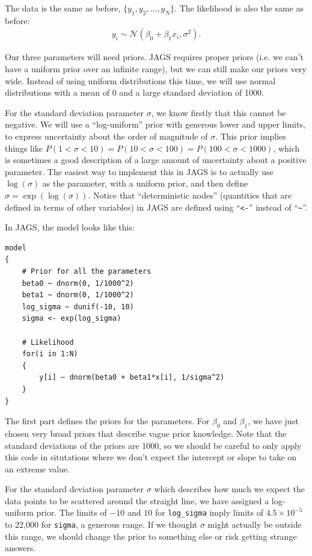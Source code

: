 The data is the same as before, $\{y_1, y_2, ..., y_N\}$. The likelihood is
also the same as before:
\begin{eqnarray}
y_i \sim \mathcal{N}(\beta_0 + \beta_1 x_i, \sigma^2).
\end{eqnarray}

Our three parameters will need priors. JAGS requires proper priors (i.e. we
can't have a uniform prior over an infinite range), but we can still make our
priors very wide. Instead of using uniform distributions this time,
we will use normal distributions with a mean of 0 and a large standard deviation
of 1000.

For the standard deviation parameter $\sigma$, we know firstly that this cannot
be negative. We will use a ``log-uniform'' prior with generous lower and upper limits,
to express uncertainty about the order of magnitude of $\sigma$. This prior implies
things like $P(1 < \sigma < 10) = P(10 < \sigma < 100) = P(100 < \sigma < 1000)$,
which is sometimes a good description of a large amount of uncertainty about
a positive parameter. The easiest way to implement this in JAGS is to actually
use $\log(\sigma)$ as the parameter, with a uniform prior, and then define
$\sigma = \exp\left(\log(\sigma)\right)$. Notice that ``deterministic nodes''
(quantities that are defined in terms of other variables) in JAGS are defined
using ``{\tt <-}'' instead of ``{\tt \~{ }}''.

In JAGS, the model looks like this:
\begin{framed}
\begin{verbatim}
model
{
    # Prior for all the parameters
    beta0 ~ dnorm(0, 1/1000^2)
    beta1 ~ dnorm(0, 1/1000^2)
    log_sigma ~ dunif(-10, 10)
    sigma <- exp(log_sigma)

    # Likelihood
    for(i in 1:N)
    {
        y[i] ~ dnorm(beta0 + beta1*x[i], 1/sigma^2)
    }
}
\end{verbatim}
\end{framed}
The first part defines the priors for the parameters. For $\beta_0$ and $\beta_1$,
we have just chosen very broad priors that describe vague prior knowledge. Note
that the standard deviations of the priors are 1000, so we should be careful
to only apply this code in situtations where we don't expect the intercept or
slope to take on an extreme value.

For the standard deviation parameter $\sigma$ which describes how much we
expect the data points to be scattered around the straight line, we have assigned
a log-uniform prior. The limits of $-10$ and $10$ for {\tt log\_sigma} imply
limits of $4.5 \times 10^{-5}$ to 22,000 for {\tt sigma}, a generous range.
If we thought $\sigma$
might actually be outside this range, we should change the prior to something
else or risk getting strange answers.


